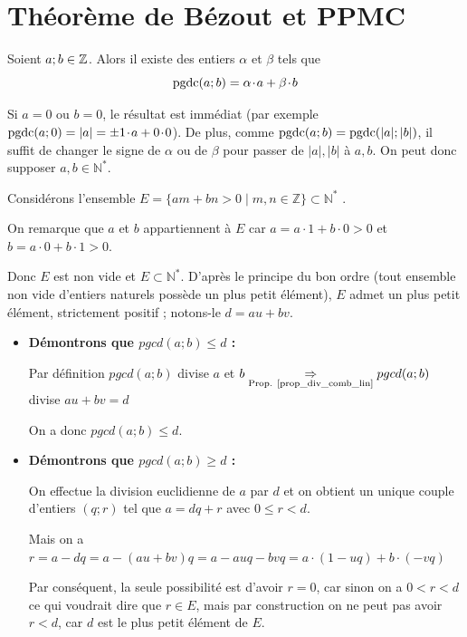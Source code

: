 \section{Théorème de Bézout et PPMC}

\begin{theoreme}%
Soient $a;b \in \mathbb{Z}$. Alors il existe des entiers $\alpha$ et $\beta$ tels que
$$\textrm{pgdc}(a;b)=\alpha\hspace*{-0.5mm}\cdot\hspace*{-0.5mm} a + \beta\hspace*{-0.5mm}\cdot\hspace*{-0.5mm} b$$
\end{theoreme}


\begin{demonstration}
Si $a=0$ ou $b=0$, le résultat est immédiat (par exemple $\textrm{pgdc}(a;0)=|a|=\pm 1\hspace*{-0.5mm}\cdot\hspace*{-0.5mm} a+0\hspace*{-0.5mm}\cdot\hspace*{-0.5mm} 0$). De plus, comme $\textrm{pgdc}(a;b)=\textrm{pgdc}(|a|;|b|)$, il suffit de changer le signe de $\alpha$ ou de $\beta$ pour passer de $|a|,|b|$ à $a,b$. On peut donc supposer $a, b \in \mathbb{N}^*$.

\medskip
Considérons l'ensemble $E = \{ am + bn > 0 \mid m, n \in \mathbb{Z} \} \subset \mathbb{N}^*$ .

On remarque que $a$ et $b$ appartiennent à $E$ car $a = a \cdot 1 + b \cdot 0 > 0$ et $b = a \cdot 0 + b \cdot 1 > 0$.

Donc $E$ est non vide et $E\subset \mathbb{N}^*$. D'après le principe du bon ordre (tout ensemble non vide d'entiers naturels possède un plus petit élément), $E$ admet un plus petit élément, strictement positif ; notons-le $d = au + bv$.

\begin{itemize}
	\item \textbf{Démontrons que $pgcd(a;b) \le d$ :}
	
	Par définition $pgcd(a;b)$ divise $a$ et $b \underset{\text{Prop. \ref{prop_div_comb_lin}}}{\Rightarrow} pgcd(a;b)$ divise $au + bv = d$
	
	On a donc $pgcd(a;b) \le d$.
	
	\item \textbf{Démontrons que $pgcd(a;b) \ge d$ :}
	
	On effectue la division euclidienne de $a$ par $d$ et on obtient un unique couple d'entiers $(q;r)$ tel que $a = dq + r$ avec $0 \le r < d$. 
	
	Mais on a $r = a - dq = a - (au + bv)q = a - auq - bvq = a \cdot (1 - uq) + b \cdot (-vq)$
	
	Par conséquent, la seule possibilité est d'avoir $r = 0$, car sinon on a $0 < r < d$ ce qui voudrait dire que $r \in E$, mais par construction on ne peut pas avoir $r < d$, car $d$ est le plus petit élément de $E$.
	

\end{itemize}
\end{demonstration}
